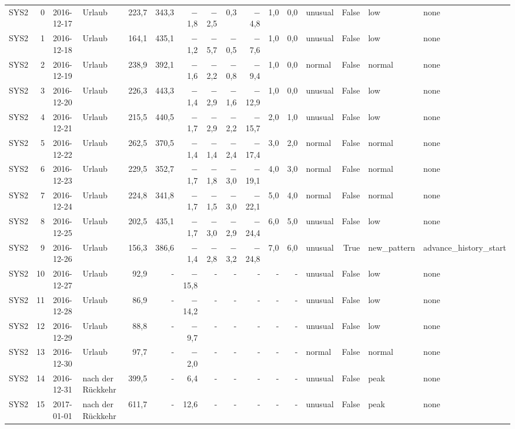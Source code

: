 \begin{tabular}{lrllrrrrrrrrlrll}
SYS2 & 0 & 2016-12-17 & Urlaub & 223,7 & 343,3 & $-$1,8 & $-$2,5 & 0,3 & $-$4,8 & 1,0 & 0,0 & unusual & False & low & none \\
SYS2 & 1 & 2016-12-18 & Urlaub & 164,1 & 435,1 & $-$1,2 & $-$5,7 & $-$0,5 & $-$7,6 & 1,0 & 0,0 & unusual & False & low & none \\
SYS2 & 2 & 2016-12-19 & Urlaub & 238,9 & 392,1 & $-$1,6 & $-$2,2 & $-$0,8 & $-$9,4 & 1,0 & 0,0 & normal & False & normal & none \\
SYS2 & 3 & 2016-12-20 & Urlaub & 226,3 & 443,3 & $-$1,4 & $-$2,9 & $-$1,6 & $-$12,9 & 1,0 & 0,0 & unusual & False & low & none \\
SYS2 & 4 & 2016-12-21 & Urlaub & 215,5 & 440,5 & $-$1,7 & $-$2,9 & $-$2,2 & $-$15,7 & 2,0 & 1,0 & unusual & False & low & none \\
SYS2 & 5 & 2016-12-22 & Urlaub & 262,5 & 370,5 & $-$1,4 & $-$1,4 & $-$2,4 & $-$17,4 & 3,0 & 2,0 & normal & False & normal & none \\
SYS2 & 6 & 2016-12-23 & Urlaub & 229,5 & 352,7 & $-$1,7 & $-$1,8 & $-$3,0 & $-$19,1 & 4,0 & 3,0 & normal & False & normal & none \\
SYS2 & 7 & 2016-12-24 & Urlaub & 224,8 & 341,8 & $-$1,7 & $-$1,5 & $-$3,0 & $-$22,1 & 5,0 & 4,0 & normal & False & normal & none \\
SYS2 & 8 & 2016-12-25 & Urlaub & 202,5 & 435,1 & $-$1,7 & $-$3,0 & $-$2,9 & $-$24,4 & 6,0 & 5,0 & unusual & False & low & none \\
SYS2 & 9 & 2016-12-26 & Urlaub & 156,3 & 386,6 & $-$1,4 & $-$2,8 & $-$3,2 & $-$24,8 & 7,0 & 6,0 & unusual & True & new\_pattern & advance\_history\_start \\
SYS2 & 10 & 2016-12-27 & Urlaub & 92,9 & - & $-$15,8 & - & - & - & - & - & unusual & False & low & none \\
SYS2 & 11 & 2016-12-28 & Urlaub & 86,9 & - & $-$14,2 & - & - & - & - & - & unusual & False & low & none \\
SYS2 & 12 & 2016-12-29 & Urlaub & 88,8 & - & $-$9,7 & - & - & - & - & - & unusual & False & low & none \\
SYS2 & 13 & 2016-12-30 & Urlaub & 97,7 & - & $-$2,0 & - & - & - & - & - & normal & False & normal & none \\
SYS2 & 14 & 2016-12-31 & nach der Rückkehr & 399,5 & - & 6,4 & - & - & - & - & - & unusual & False & peak & none \\
SYS2 & 15 & 2017-01-01 & nach der Rückkehr & 611,7 & - & 12,6 & - & - & - & - & - & unusual & False & peak & none \\

\end{tabular}

